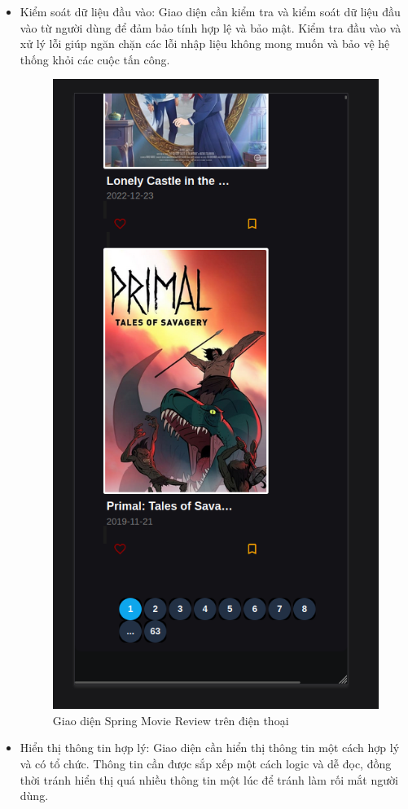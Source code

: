 \documentclass[12pt]{article}
\begin{document}
\begin{itemize}
    \item Kiểm soát dữ liệu đầu vào: Giao diện cần kiểm tra và kiểm soát dữ liệu đầu vào từ người dùng để đảm bảo tính hợp lệ và bảo mật. Kiểm tra đầu vào và xử lý lỗi giúp ngăn chặn các lỗi nhập liệu không mong muốn và bảo vệ hệ thống khỏi các cuộc tấn công.
    \begin{figure}[H]
        \centering
        \includegraphics[scale=0.45]{Figs/phone_screen.png}
        \caption{Giao diện Spring Movie Review trên điện thoại}
    \end{figure}
    \item Hiển thị thông tin hợp lý: Giao diện cần hiển thị thông tin một cách hợp lý và có tổ chức. Thông tin cần được sắp xếp một cách logic và dễ đọc, đồng thời tránh hiển thị quá nhiều thông tin một lúc để tránh làm rối mắt người dùng.


\end{itemize}
\end{document}
